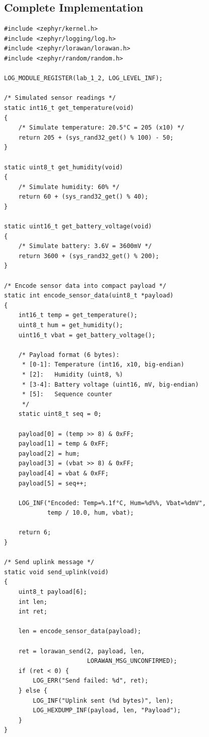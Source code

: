 \documentclass[11pt,a4paper]{article}
\begin{document}
\begin{solutionbox}
\subsection{Complete Implementation}

\begin{lstlisting}
#include <zephyr/kernel.h>
#include <zephyr/logging/log.h>
#include <zephyr/lorawan/lorawan.h>
#include <zephyr/random/random.h>

LOG_MODULE_REGISTER(lab_1_2, LOG_LEVEL_INF);

/* Simulated sensor readings */
static int16_t get_temperature(void)
{
    /* Simulate temperature: 20.5°C = 205 (x10) */
    return 205 + (sys_rand32_get() % 100) - 50;
}

static uint8_t get_humidity(void)
{
    /* Simulate humidity: 60% */
    return 60 + (sys_rand32_get() % 40);
}

static uint16_t get_battery_voltage(void)
{
    /* Simulate battery: 3.6V = 3600mV */
    return 3600 + (sys_rand32_get() % 200);
}

/* Encode sensor data into compact payload */
static int encode_sensor_data(uint8_t *payload)
{
    int16_t temp = get_temperature();
    uint8_t hum = get_humidity();
    uint16_t vbat = get_battery_voltage();

    /* Payload format (6 bytes):
     * [0-1]: Temperature (int16, x10, big-endian)
     * [2]:   Humidity (uint8, %)
     * [3-4]: Battery voltage (uint16, mV, big-endian)
     * [5]:   Sequence counter
     */
    static uint8_t seq = 0;

    payload[0] = (temp >> 8) & 0xFF;
    payload[1] = temp & 0xFF;
    payload[2] = hum;
    payload[3] = (vbat >> 8) & 0xFF;
    payload[4] = vbat & 0xFF;
    payload[5] = seq++;

    LOG_INF("Encoded: Temp=%.1f°C, Hum=%d%%, Vbat=%dmV",
            temp / 10.0, hum, vbat);

    return 6;
}

/* Send uplink message */
static void send_uplink(void)
{
    uint8_t payload[6];
    int len;
    int ret;

    len = encode_sensor_data(payload);

    ret = lorawan_send(2, payload, len,
                       LORAWAN_MSG_UNCONFIRMED);
    if (ret < 0) {
        LOG_ERR("Send failed: %d", ret);
    } else {
        LOG_INF("Uplink sent (%d bytes)", len);
        LOG_HEXDUMP_INF(payload, len, "Payload");
    }
}


\end{lstlisting}
\end{solutionbox}
\end{document}
